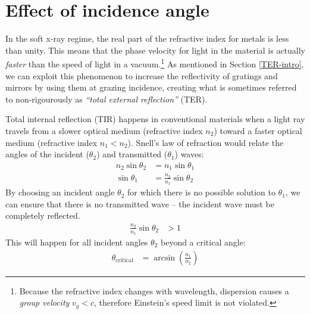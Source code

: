 \section{Effect of incidence angle}
\label{incidenceAngle}
\label{TER}
In the soft x-ray regime, the real part of the refractive index for metals is less than unity.  This means that the phase velocity for light in the material is actually \emph{faster} than the speed of light in a vacuum.\footnote{Because the refractive index changes with wavelength, dispersion causes a \emph{group velocity} $v_g < c$, therefore Einstein's speed limit is not violated.}  As mentioned in Section \ref{TER-intro}, we can exploit this phenomenon to increase the reflectivity of gratings and mirrors by using them at grazing incidence, creating what is sometimes referred to non-rigourously as \emph{``total external reflection''} (TER).

Total internal reflection (TIR) happens in conventional materials when a light ray travels from a slower optical medium (refractive index $n_2$) toward a faster optical medium (refractive index $n_1 < n_2$).  Snell's law of refraction would relate the angles of the incident ($\theta_2$) and transmitted ($\theta_1$) waves:
\begin{align}
n_2 \sin \theta_2 &= n_1 \sin \theta_1 \\
\sin \theta_1 &= \frac{n_2}{n_1} \sin \theta_2
\end{align}
By choosing an incident angle $\theta_2$ for which there is no possible solution to $\theta_1$, we can ensure that there is no transmitted wave -- the incident wave must be completely reflected.
\begin{align}
 \frac{n_2}{n_1} \sin \theta_2 &> 1
\end{align}
This will happen for all incident angles $\theta_2$ beyond a critical angle:
\begin{align}
\theta_{\mathrm{critical}} &= \arcsin \left( \frac{n_1}{n_2} \right)
\end{align}


